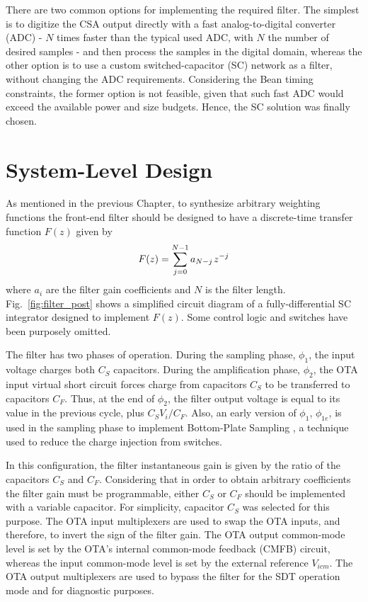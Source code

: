 There are two common options for implementing the required filter. The simplest is to digitize the CSA output directly with a fast analog-to-digital converter (ADC)  - $N$ times faster than the typical used ADC, with $N$ the number of desired samples - and then process the samples in the digital domain, whereas the other option is to use a custom \mbox{switched-capacitor} (SC) network as a filter, without changing the ADC requirements. Considering the Bean timing constraints, the former option is not feasible, given that such fast ADC would exceed the available power and size budgets. Hence, the SC solution was finally chosen.


\section{System-Level Design}
As mentioned in the previous Chapter, to synthesize arbitrary weighting functions the front-end filter should be designed to have a  discrete-time transfer function $F(z)$ given by
\begin{equation}
F(z) = \sum_{j=0}^{N-1}a_{N-j} \hspace{0.1em}z^{-j} \label{eq:filter_tf}
\end{equation}
where $a_i$ are the filter gain coefficients and $N$ is the filter length. Fig.~\ref{fig:filter_post} shows a simplified circuit diagram of a fully-differential SC integrator designed to implement $F(z)$. Some control logic and switches have been purposely omitted.

The filter has two phases of operation. During the sampling phase, $\phi_1$, the input voltage charges  both $C_S$ capacitors. During the amplification phase, $\phi_2$, the OTA input virtual short circuit forces charge from capacitors $C_S$ to be transferred to capacitors $C_F$. Thus, at the end of $\phi_2$, the filter output voltage is equal to its value in the previous cycle, plus $C_S V_i/C_F$. Also, an early version of $\phi_1$, $\phi_{1e}$, is used in the sampling phase to implement Bottom-Plate Sampling \citep{haigh101}, a technique used to reduce the charge injection from switches.

In this configuration, the filter instantaneous gain is given by the ratio of the capacitors $C_S$ and $C_F$.  Considering that in order to obtain arbitrary coefficients the filter gain must be programmable, either $C_S$ or $C_F$ should be implemented with a variable capacitor. For simplicity, capacitor $C_S$ was selected for this purpose. The OTA input multiplexers are used to swap the OTA inputs, and therefore, to invert the sign of the filter gain. The OTA output common-mode level is set by the OTA's internal common-mode feedback (CMFB) circuit, whereas the input common-mode level is set by the external reference $V_\textit{icm}$. The OTA output multiplexers are used to bypass the filter for the SDT operation mode and for diagnostic purposes.


